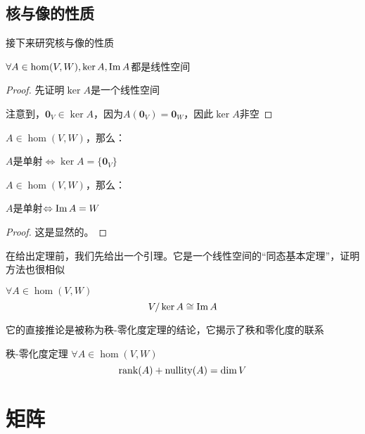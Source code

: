 \documentclass[12pt, a4paper, oneside, UTF8]{ctexbook}
\begin{document}
			\subsection{核与像的性质}
				接下来研究核与像的性质
				\begin{para}{0}
					\point{}
						\begin{proposition}
							$\forall A \in \hom(V,W),\ker A,\operatorname{Im} A$都是线性空间
						\end{proposition}
						\begin{proof}
							先证明$\ker A$是一个线性空间

							注意到，$\mathbf{0}_V \in \ker A$，因为$A(\mathbf{0}_V)=\mathbf{0}_W$，因此$\ker A$非空
						\end{proof}
					\point{}
						\begin{proposition}
							$A \in \hom(V,W)$，那么：

							$A$是单射$\Leftrightarrow \ker A = \{\mathbf{0}_V\}$
						\end{proposition}
					\point{}
						\begin{proposition}
							$A \in \hom(V,W)$，那么：

							$A$是单射$\Leftrightarrow \operatorname{Im} A = W$
						\end{proposition}
						\begin{proof}
							这是显然的。
						\end{proof}
						在给出定理前，我们先给出一个引理。它是一个线性空间的“同态基本定理”，证明方法也很相似
						\begin{lemma}{}{}
							$\forall A \in \hom(V,W)$
							\begin{equation}
								V/\ker A \cong \operatorname{Im} A
							\end{equation}
						\end{lemma}
						它的直接推论是被称为秩-零化度定理的结论，它揭示了秩和零化度的联系
						\begin{them}{秩-零化度定理}{}
							$\forall A \in \hom(V,W)$
							\begin{equation}
								\operatorname{rank}(A)+\operatorname{nullity}(A) = \dim V
							\end{equation}
						\end{them}
				\end{para}
	\section{矩阵}
\end{document}

